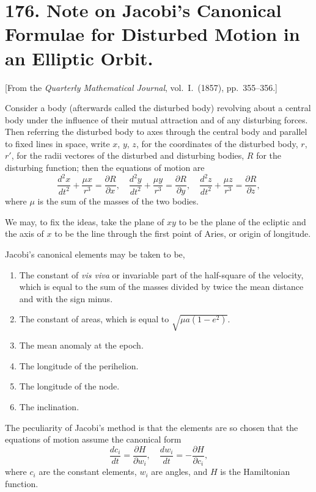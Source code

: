\documentclass[11pt,a4paper]{article}
\theoremstyle{plain}
\begin{document}
\newpage
\section*{176. Note on Jacobi's Canonical Formulae for Disturbed Motion in an Elliptic Orbit.}

[From the \textit{Quarterly Mathematical Journal}, vol.~I.~(1857), pp.~355--356.]

Consider a body (afterwards called the disturbed body) revolving about a central body under the influence of their mutual attraction and of any disturbing forces. Then referring the disturbed body to axes through the central body and parallel to fixed lines in space, write $x$, $y$, $z$, for the coordinates of the disturbed body, $r$, $r'$, for the radii vectores of the disturbed and disturbing bodies, $R$ for the disturbing function; then the equations of motion are
\[
\frac{d^2x}{dt^2} + \frac{\mu x}{r^3} = \frac{\partial R}{\partial x},\quad
\frac{d^2y}{dt^2} + \frac{\mu y}{r^3} = \frac{\partial R}{\partial y},\quad
\frac{d^2z}{dt^2} + \frac{\mu z}{r^3} = \frac{\partial R}{\partial z},
\]
where $\mu$ is the sum of the masses of the two bodies.

We may, to fix the ideas, take the plane of $xy$ to be the plane of the ecliptic and the axis of $x$ to be the line through the first point of Aries, or origin of longitude.

Jacobi's canonical elements may be taken to be,
\begin{enumerate}[label=\arabic*.]
\item The constant of \textit{vis viva} or invariable part of the half-square of the velocity, which is equal to the sum of the masses divided by twice the mean distance and with the sign minus.
\item The constant of areas, which is equal to $\sqrt{\mu a(1-e^2)}$.
\item The mean anomaly at the epoch.
\item The longitude of the perihelion.
\item The longitude of the node.
\item The inclination.
\end{enumerate}

The peculiarity of Jacobi's method is that the elements are so chosen that the equations of motion assume the canonical form
\[
\frac{dc_i}{dt} = \frac{\partial H}{\partial w_i},\quad
\frac{dw_i}{dt} = -\frac{\partial H}{\partial c_i},
\]
where $c_i$ are the constant elements, $w_i$ are angles, and $H$ is the Hamiltonian function.
\end{document}
